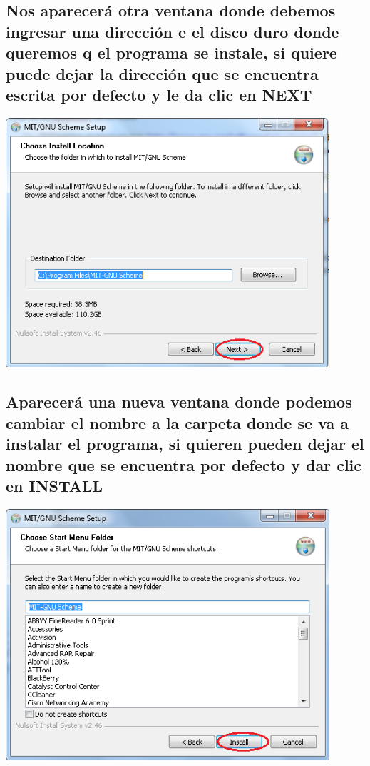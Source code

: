 \documentclass[11pt]{article} %
\begin{document}
\subsection{Nos aparecerá otra ventana donde debemos ingresar una dirección e el disco duro donde queremos q el programa se instale, si quiere puede dejar la dirección que se encuentra escrita por defecto y le da clic en NEXT}
\begin{center}
\includegraphics[width=12cm]{imagenes/4.png}
\end{center}

\subsection{Aparecerá una nueva ventana donde podemos cambiar el nombre a la carpeta donde se va a instalar el programa, si quieren pueden dejar el nombre que se encuentra por defecto y dar clic en  INSTALL }
\begin{center}
\includegraphics[width=12cm]{imagenes/5.png}
\end{center}
\end{document}

